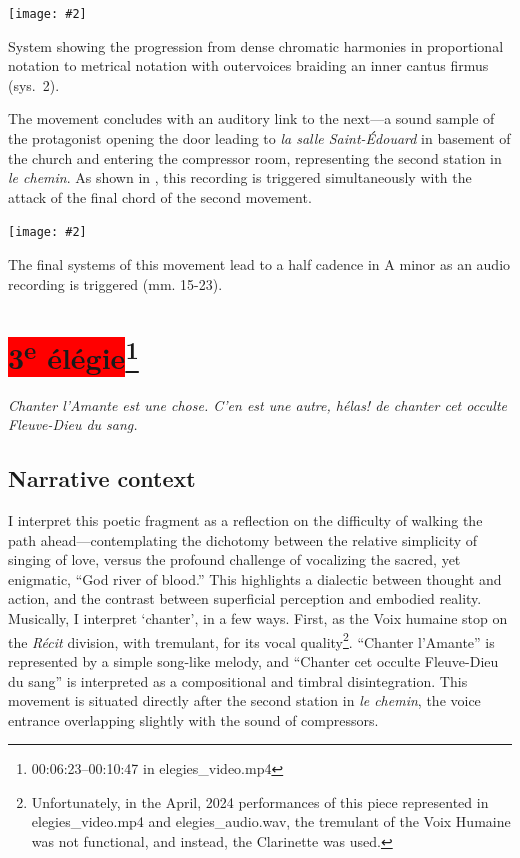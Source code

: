 \documentclass[12pt,twoside,maitrise]{dms_ks}
\newcommand{\customincludeexamples}[4][]{%
    \begin{example}[H]
        \centering
        \texttt{[image: \#2]}
        \caption{#4}
	\label{#3} 
    \end{example}
}
\theoremstyle{definition}
\begin{document}
{{\customincludeexamples[width=\textwidth]{2e_2}{ex:2e_2}{System showing the progression from dense chromatic harmonies in proportional notation to metrical notation with outervoices braiding an inner cantus firmus (sys.~2).}

The movement concludes with an auditory link to the next---a sound sample of the protagonist opening the door leading to \textit{la salle Saint-Édouard} in basement of the church and entering the compressor room, representing the second station in \textit{le chemin}.
As shown in , this recording is triggered simultaneously with the attack of the final chord of the second movement.

\customincludeexamples[width=\textwidth]{2e_3}{ex:2e_3}{The final systems of this movement lead to a half cadence in A minor as an audio recording is triggered (mm. 15-23).}

\section{\colorbox{red}{3\textsuperscript{e} élégie}\footnote{00:06:23--00:10:47 in elegies\_video.mp4}}

\epigraph{\textit{Chanter l'Amante est une chose. C'en est une autre, hélas! de chanter cet occulte Fleuve-Dieu du sang.}}{}

\subsection{Narrative context}

I interpret this poetic fragment as a reflection on the difficulty of walking the path ahead---contemplating the dichotomy between the relative simplicity of singing of love, versus the profound challenge of vocalizing the sacred, yet enigmatic, “God river of blood.”  
This highlights a dialectic between thought and action, and the contrast between superficial perception and embodied reality.  
Musically, I interpret `chanter', in a few ways. 
First, as the Voix humaine stop on the \textit{Récit} division, with tremulant, for its vocal quality\footnote{Unfortunately, in the April, 2024 performances of this piece represented in elegies\_video.mp4 and elegies\_audio.wav, the tremulant of the Voix Humaine was not functional, and instead, the Clarinette was used.}.  
“Chanter l'Amante” is represented by a simple song-like melody, and “Chanter cet occulte Fleuve-Dieu du sang” is interpreted as a compositional and timbral disintegration. 
This movement is situated directly after the second station in \textit{le chemin}, the voice entrance overlapping slightly with the sound of compressors.

}}
\end{document}
